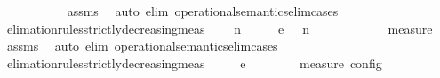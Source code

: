 \begin{isabellebody}
\ \ \ \ \ {\isacartoucheopen}{\isasymmu}\ {\isasymPsi}\ {\isachargreater}\ {\isasymmu}\ {\isasymPsi}\isanewline
%
\isadelimproof
%
\endisadelimproof
%
\isatagproof
{}\isamarkupfalse%
\ assms\ \isamarkupfalse%
\ {\isacharparenleft}auto\ elim{\isacharcolon}\ operational{\isacharunderscore}semantics{\isacharunderscore}elim{\isachardot}cases{\isacharparenright}%
\endisatagproof
{\isafoldproof}%
%
\isadelimproof
\isanewline
%
\endisadelimproof
\isanewline
{}\isamarkupfalse%
\ elimation{\isacharunderscore}rules{\isacharunderscore}strictly{\isacharunderscore}decreasing{\isacharunderscore}meas{\isacharcolon}\isanewline
\ \ \ {\isacartoucheopen}{\isacharparenleft}{\isasymGamma}\ n\ {\isasymturnstile}\ {\isasymPsi}\ {\isasymtriangleright}\ {\isasymPhi}\ \ {\isasymhookrightarrow}\isactrlsub e\ \ {\isacharparenleft}{\isasymGamma}\ n\ {\isasymturnstile}\ {\isasymPsi}\ {\isasymtriangleright}\ {\isasymPhi}\isanewline
\ \ \ \ \ {\isacartoucheopen}{\isacharparenleft}{\isasymPsi}\ {\isasymPsi}\ {\isasymin}\ measure\ {\isasymmu}{\isacartoucheclose}\isanewline
%
\isadelimproof
%
\endisadelimproof
%
\isatagproof
{}\isamarkupfalse%
\ assms\ \isamarkupfalse%
\ {\isacharparenleft}auto\ elim{\isacharcolon}\ operational{\isacharunderscore}semantics{\isacharunderscore}elim{\isachardot}cases{\isacharparenright}%
\endisatagproof
{\isafoldproof}%
%
\isadelimproof
\isanewline
%
\endisadelimproof
\isanewline
{}\isamarkupfalse%
\ elimation{\isacharunderscore}rules{\isacharunderscore}strictly{\isacharunderscore}decreasing{\isacharunderscore}meas{\isacharprime}{\isacharcolon}\isanewline
\ \ \ {\isacartoucheopen}{\isasymS}\ \ {\isasymhookrightarrow}\isactrlsub e\ \ {\isasymS}\isanewline
\ \ \ {\isacartoucheopen}{\isacharparenleft}{\isasymS}\ {\isasymS}\ {\isasymin}\ measure\ {\isasymmu}\isactrlsub c\isactrlsub o\isactrlsub n\isactrlsub f\isactrlsub i\isactrlsub g{\isacartoucheclose}\isanewline

\end{isabellebody}
